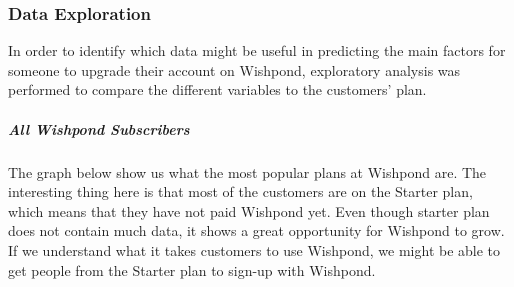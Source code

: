 \documentclass[]{article}
\newenvironment{Shaded}{\begin{snugshade}}{\end{snugshade}}
\newcommand{\KeywordTok}[1]{\textcolor[rgb]{0.13,0.29,0.53}{\textbf{#1}}}
\newcommand{\DataTypeTok}[1]{\textcolor[rgb]{0.13,0.29,0.53}{#1}}
\newcommand{\StringTok}[1]{\textcolor[rgb]{0.31,0.60,0.02}{#1}}
\newcommand{\CommentTok}[1]{\textcolor[rgb]{0.56,0.35,0.01}{\textit{#1}}}
\newcommand{\OperatorTok}[1]{\textcolor[rgb]{0.81,0.36,0.00}{\textbf{#1}}}
\newcommand{\NormalTok}[1]{#1}
\let\oldsubparagraph\subparagraph
\renewcommand{\subparagraph}[1]{\oldsubparagraph{#1}\mbox{}}
\begin{document}
\begin{Shaded}
\end{Shaded}

\subsubsection{Data Exploration}\label{data-exploration}

In order to identify which data might be useful in predicting the main
factors for someone to upgrade their account on Wishpond, exploratory
analysis was performed to compare the different variables to the
customers' plan.

\subparagraph{All Wishpond Subscribers}\label{all-wishpond-subscribers}

The graph below show us what the most popular plans at Wishpond are. The
interesting thing here is that most of the customers are on the Starter
plan, which means that they have not paid Wishpond yet. Even though
starter plan does not contain much data, it shows a great opportunity
for Wishpond to grow. If we understand what it takes customers to use
Wishpond, we might be able to get people from the Starter plan to
sign-up with Wishpond.
\end{document}
